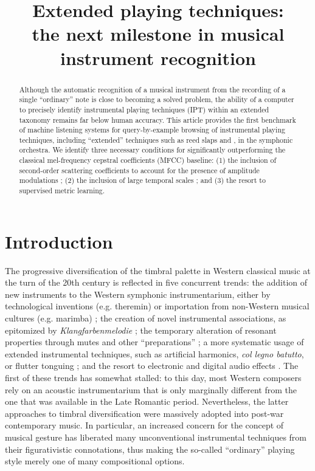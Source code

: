 \documentclass{article}
\title{Extended playing techniques: \\
the next milestone in musical instrument recognition}
\makeatletter
\newcommand*{\eg}{e.g.\@\xspace}
\makeatother
\begin{document}
%
\maketitle

\begin{abstract}
Although the automatic recognition of a musical instrument from the recording of a single ``ordinary'' note is close to becoming a solved problem, the ability of a computer to precisely identify instrumental playing techniques (IPT) within an extended taxonomy remains far below human accuracy.
This article provides the first benchmark of machine listening systems for query-by-example browsing of instrumental playing techniques, including ``extended'' techniques such as reed slaps and , in the symphonic orchestra.
We identify three necessary conditions for significantly outperforming the classical mel-frequency cepstral coefficients (MFCC) baseline:
(1) the inclusion of second-order scattering coefficients to account for the presence of amplitude modulations ;
(2) the inclusion of large temporal scales ; and
(3) the resort to supervised metric learning.
\end{abstract}

\section{Introduction}\label{sec:introduction}
The progressive diversification of the timbral palette in Western classical music at the turn of the 20th century is reflected in five concurrent trends:
the addition of new instruments to the Western symphonic instrumentarium, either by technological inventions (\eg theremin) or importation from non-Western musical cultures (\eg marimba) \cite{sachs2012book};
the creation of novel instrumental associations, as epitomized by \emph{Klangfarbenmelodie} \cite{schoenberg2010book};
the temporary alteration of resonant properties through mutes and other ``preparations'' \cite{dianova2007phd};
a more systematic usage of extended instrumental techniques, such as artificial harmonics, \emph{col legno batutto}, or flutter tonguing \cite{kostka2016book};
and the resort to electronic and digital audio effects \cite{zolzer2011dafx}.
The first of these trends has somewhat stalled: to this day, most Western composers rely on an acoustic instrumentarium that is only marginally different from the one that was available in the Late Romantic period.
Nevertheless, the latter approaches to timbral diversification were massively adopted into post-war contemporary music.
In particular, an increased concern for the concept of musical gesture \cite{godoy2009book} has liberated many unconventional instrumental techniques from their figurativistic connotations, thus making the so-called ``ordinary'' playing style merely one of many compositional options.
\end{document}
